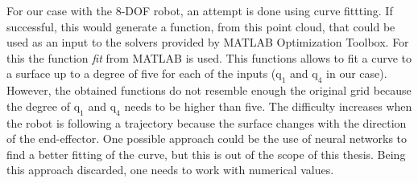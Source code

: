 %
%





For our case with the 8-DOF robot, an attempt is done using curve fittting. If successful, this would generate a function, from this point cloud, that could be used as an input to the solvers provided by MATLAB Optimization Toolbox. For this the function \textit{fit} from MATLAB is used. This functions allows to fit a curve to a surface up to a degree of five for each of the inputs ($\mathrm{q_1}$ and $\mathrm{q_4}$ in our case).  However, the obtained functions do not resemble enough the original grid because the degree of $\mathrm{q_1}$ and $\mathrm{q_4}$ needs to be higher than five. The difficulty increases when the robot is following a trajectory because the surface changes with the direction of the end-effector. One possible approach could be the use of neural networks to find a better fitting of the curve, but this is out of the scope of this thesis. Being this approach discarded, one needs to work with numerical values. 





